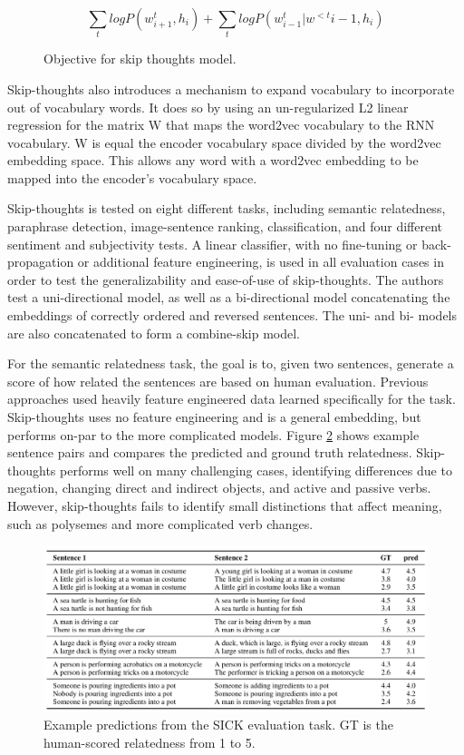 \begin{figure}
    \centering
    $$
    \sum\limits_{t}logP(w^t_{i+1}, h_i) + \sum\limits_{t}log P (w^t_{i-1}|w^{<t}{i-1}, h_i)
    $$
    \caption{Objective for skip thoughts model.}
    \label{fig:skipthoughts-obj}
\end{figure}

Skip-thoughts also introduces a mechanism to expand vocabulary to incorporate out of vocabulary words. It does so by using an un-regularized L2 linear regression for the matrix W that maps the word2vec vocabulary to the RNN vocabulary. W is equal the encoder vocabulary space divided by the word2vec embedding space. This allows any word with a word2vec embedding to be mapped into the encoder's vocabulary space.

Skip-thoughts is tested on eight different tasks, including semantic relatedness, paraphrase detection, image-sentence ranking, classification, and four different sentiment and subjectivity tests. A linear classifier, with no fine-tuning or back-propagation or additional feature engineering, is used in all evaluation cases in order to test the generalizability and ease-of-use of skip-thoughts. The authors test a uni-directional model, as well as a bi-directional model concatenating the embeddings of correctly ordered and reversed sentences. The uni- and bi- models are also concatenated to form a combine-skip model.

For the semantic relatedness task, the goal is to, given two sentences, generate a score of how related the sentences are based on human evaluation. Previous approaches used heavily feature engineered data learned specifically for the task. Skip-thoughts uses no feature engineering and is a general embedding, but performs on-par to the more complicated models. Figure \ref{fig:skip-thoughts-sr} shows example sentence pairs and compares the predicted and ground truth relatedness. Skip-thoughts performs well on many challenging cases, identifying differences due to negation, changing direct and indirect objects, and active and passive verbs. However, skip-thoughts fails to identify small distinctions that affect meaning, such as polysemes and more complicated verb changes.

\begin{figure}
\centering
  \includegraphics[width=1\linewidth]{files/skipthoughts-5.png}
  \caption{Example predictions from the SICK evaluation task. GT is the human-scored relatedness from 1 to 5.}
  \label{fig:skip-thoughts-sr}
\end{figure}

